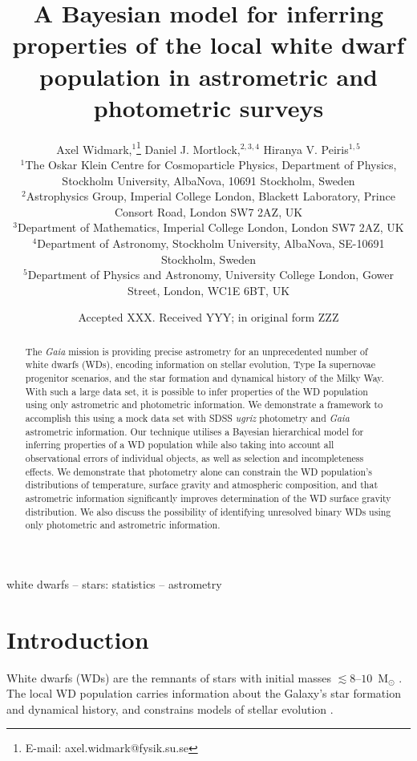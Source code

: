 \documentclass[fleqn,usenatbib]{mnras}
\title[A Bayesian model for inferring properties of the white dwarf population]{A Bayesian model for inferring properties of the local white dwarf population in astrometric and photometric surveys}
\author[A. Widmark et al.]{
Axel Widmark,$^1$\thanks{E-mail: axel.widmark@fysik.su.se} 
Daniel J. Mortlock,$^{2,3,4}$
Hiranya V. Peiris$^{1,5}$
\\
$^1$The Oskar Klein Centre for Cosmoparticle Physics, Department of
Physics, Stockholm University, AlbaNova, 10691 Stockholm, Sweden\\
$^2$Astrophysics Group, Imperial College London, Blackett Laboratory, Prince Consort Road, London SW7 2AZ, UK\\
$^3$Department of Mathematics, Imperial College London, London SW7 2AZ, UK\\
$^4$Department of Astronomy, Stockholm University, AlbaNova, SE-10691 Stockholm, Sweden\\
$^5$Department of Physics and Astronomy, University College London, Gower Street, London, WC1E 6BT, UK\\
}
\date{Accepted XXX. Received YYY; in original form ZZZ}
\begin{document}
\label{firstpage}
\pagerange{\pageref{firstpage}--\pageref{lastpage}}
\maketitle

\begin{abstract}
The \emph{Gaia} mission is providing precise astrometry for an unprecedented number of white dwarfs (WDs), encoding information on stellar evolution, Type Ia supernovae progenitor scenarios, and the star formation and dynamical history of the Milky Way. With such a large data set, it is possible to infer properties of the WD population using only astrometric and photometric information. We demonstrate a framework to accomplish this using a mock data set with SDSS \emph{ugriz} photometry and \emph{Gaia} astrometric information.
Our technique utilises a Bayesian hierarchical model for inferring properties of a WD population while also taking into account all observational errors of individual objects, as well as selection and incompleteness effects.
We demonstrate that photometry alone can constrain the WD population's  distributions of temperature, surface gravity and atmospheric composition, and that astrometric information significantly improves determination of the WD surface gravity distribution. We also discuss the possibility of identifying unresolved binary WDs using only photometric and astrometric information.
\end{abstract}

\begin{keywords}
white dwarfs -- stars: statistics -- astrometry
\end{keywords}









\section{Introduction}

White dwarfs (WDs) are the remnants of stars with initial masses $\lesssim8\mbox{--}10$~M$_\odot$ \citep{1996ApJ...460..489R,2009MNRAS.395.1409S}. The local WD population carries information about the Galaxy's star formation and dynamical history, and constrains models of stellar evolution \citep{1987ApJ...315L..77W,2016NewAR..72....1G,2018arXiv180505849E}.
\end{document}
